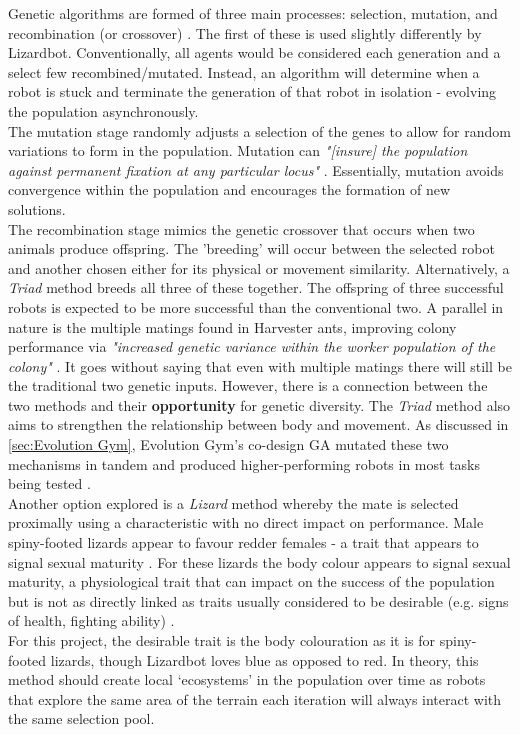 \documentclass{article}
\begin{document}
Genetic algorithms are formed of three main processes: selection, mutation, and recombination (or crossover) . The first of these is used slightly differently by Lizardbot. Conventionally, all agents would be considered each generation and a select few recombined/mutated. Instead, an algorithm will determine when a robot is stuck and terminate the generation of that robot in isolation - evolving the population asynchronously. \\

The mutation stage randomly adjusts a selection of the genes to allow for random variations to form in the population. Mutation can \textit{"[insure]
the population against permanent fixation at any particular locus"} . Essentially, mutation avoids convergence within the population and encourages the formation of new solutions. \\

The recombination stage mimics the genetic crossover that occurs when two animals produce offspring. The 'breeding' will occur between the selected robot and another chosen either for its physical or movement similarity. Alternatively, a \textit{Triad} method breeds all three of these together. The offspring of three successful robots is expected to be more successful than the conventional two. A parallel in nature is the multiple matings found in Harvester ants, improving colony performance via \textit{"increased genetic variance within the worker population of the colony"} . It goes without saying that even with multiple matings there will still be the traditional two genetic inputs. However, there is a connection between the two methods and their \textbf{opportunity} for genetic diversity. 
The \textit{Triad} method also aims to strengthen the relationship between body and movement. As discussed in \ref{sec:Evolution Gym}, Evolution Gym's co-design GA mutated these two mechanisms in tandem and produced higher-performing robots in most tasks being tested .\\

Another option explored is a \textit{Lizard} method whereby the mate is selected proximally using a characteristic with no direct impact on performance. Male spiny-footed lizards appear to favour redder females - a trait that appears to signal sexual maturity . For these lizards the body colour appears to signal sexual maturity, a physiological trait that can impact on the success of the population but is not as directly linked as traits usually considered to be desirable (e.g. signs of health, fighting ability) .\\
For this project, the desirable trait is the body colouration as it is for spiny-footed lizards, though Lizardbot loves blue as opposed to red. In theory, this method should create local ‘ecosystems’ in the population over time as robots that explore the same area of the terrain each iteration will always interact with the same selection pool. \\
\end{document}
